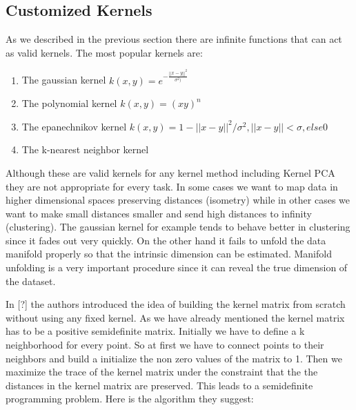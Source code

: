 \documentclass[12pt,letterpaper,doublespaced,ETD,dvips,proposal]{gtthesis}
\begin{document}
\begin{Body}
\subsection{Customized Kernels}

As we described in the previous section there are infinite functions
that can act as valid kernels. The most popular kernels are:
\begin{enumerate}
  \item The gaussian kernel $k(x, y)=e^{-\frac{||x-y||^2}{\sigma^2)}}$
  \item The polynomial kernel $k(x, y)=(xy)^n$
  \item The epanechnikov kernel $k(x, y)=1-||x-y||^2/\sigma^2, ||x-y||<\sigma, else 0$
  \item The k-nearest neighbor kernel
\end{enumerate}

Although these are valid kernels for any kernel method including
Kernel PCA they are not appropriate for every task. In some cases we
want to map data in higher dimensional spaces preserving distances
(isometry) while in other cases we want to make small distances
smaller and send high distances to infinity (clustering). The
gaussian kernel for example tends to behave better in clustering
since it fades out very quickly. On the other hand it fails to
unfold the data manifold properly so that the intrinsic dimension
can be estimated. Manifold unfolding is a very important procedure
since it can reveal the true dimension of the dataset.

In [?] the authors introduced the idea of building the kernel matrix
from scratch without using any fixed kernel. As we have already
mentioned the kernel matrix has to be a positive semidefinite
matrix. Initially we have to define a k neighborhood  for every
point. So at first we have to connect points to their neighbors and
build a initialize the non zero values of the matrix to 1. Then we
maximize the trace of the kernel matrix under the constraint that
the the distances in the kernel matrix are preserved. This leads to
a semidefinite programming problem. Here is the algorithm they
suggest:

\vspace{1cm}



\end{Body}
\end{document}
